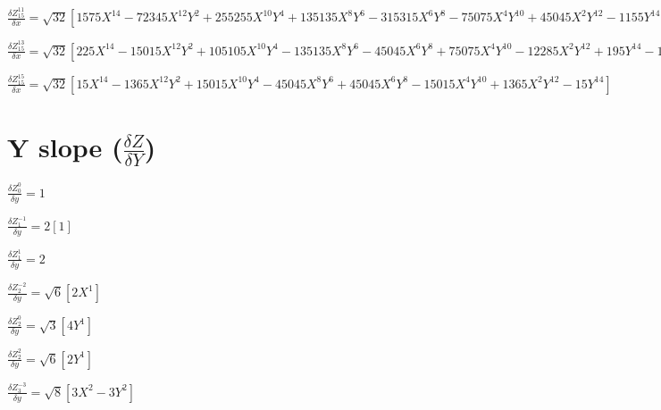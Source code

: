 \documentclass[10pt,landscape]{article}
\begin{document}
\vspace{1.2 mm}
\noindent $ \frac{\delta Z^{11}_{15}}{\delta x} = \sqrt{32} [1575X^{14} -72345X^{12}Y^{2} +255255X^{10}Y^{4} +135135X^{8}Y^{6} -315315X^{6}Y^{8} -75075X^{4}Y^{10} +45045X^{2}Y^{12} -1155Y^{14} -2366X^{12} +108108X^{10}Y^{2} -450450X^{8}Y^{4} +168168X^{6}Y^{6} +270270X^{4}Y^{8} -84084X^{2}Y^{10} +2002Y^{12} +858X^{10} -38610X^{8}Y^{2} +180180X^{6}Y^{4} -180180X^{4}Y^{6} +38610X^{2}Y^{8} -858Y^{10}] $

\vspace{1.2 mm}
\noindent $ \frac{\delta Z^{13}_{15}}{\delta x} = \sqrt{32} [225X^{14} -15015X^{12}Y^{2} +105105X^{10}Y^{4} -135135X^{8}Y^{6} -45045X^{6}Y^{8} +75075X^{4}Y^{10} -12285X^{2}Y^{12} +195Y^{14} -182X^{12} +12012X^{10}Y^{2} -90090X^{8}Y^{4} +168168X^{6}Y^{6} -90090X^{4}Y^{8} +12012X^{2}Y^{10} -182Y^{12}] $

\vspace{1.2 mm}
\noindent $ \frac{\delta Z^{15}_{15}}{\delta x} = \sqrt{32} [15X^{14} -1365X^{12}Y^{2} +15015X^{10}Y^{4} -45045X^{8}Y^{6} +45045X^{6}Y^{8} -15015X^{4}Y^{10} +1365X^{2}Y^{12} -15Y^{14}] $

\vspace{1.2 mm}
\clearpage

\section{Y slope ($\frac{\delta Z}{\delta Y}$)}

\noindent $ \frac{\delta Z^{0}_{0}}{\delta y} = 1 $

\vspace{1.2 mm}
\noindent $ \frac{\delta Z^{-1}_{1}}{\delta y} = 2 [1] $

\vspace{1.2 mm}
\noindent $ \frac{\delta Z^{1}_{1}}{\delta y} = 2 $

\vspace{1.2 mm}
\noindent $ \frac{\delta Z^{-2}_{2}}{\delta y} = \sqrt{6} [2X^{1}] $

\vspace{1.2 mm}
\noindent $ \frac{\delta Z^{0}_{2}}{\delta y} = \sqrt{3} [4Y^{1}] $

\vspace{1.2 mm}
\noindent $ \frac{\delta Z^{2}_{2}}{\delta y} = \sqrt{6} [2Y^{1}] $

\vspace{1.2 mm}
\noindent $ \frac{\delta Z^{-3}_{3}}{\delta y} = \sqrt{8} [3X^{2} -3Y^{2}] $
\end{document}
